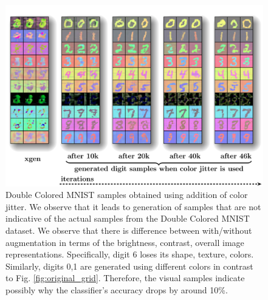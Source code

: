 \begin{figure}[H]
    \centering 
    \includegraphics[width=0.9\linewidth]{../openreview/images/x_gen_data_augment.pdf}
        \caption{Double Colored MNIST samples obtained using addition of color jitter. We observe that it leads to generation of samples that are not indicative of the actual samples from the Double Colored MNIST dataset.  We observe that there is difference between with/without augmentation in terms of the brightness, contrast, overall image representations. Specifically, digit 6 loses its shape, texture, colors. Similarly, digits 0,1 are generated using different colors in contrast to Fig. \ref{fig:original_grid}. Therefore, the visual samples indicate possibly why the classifier's accuracy drops by around 10\%. 
        }
    \label{fig:data_augment_grid}
\end{figure}



